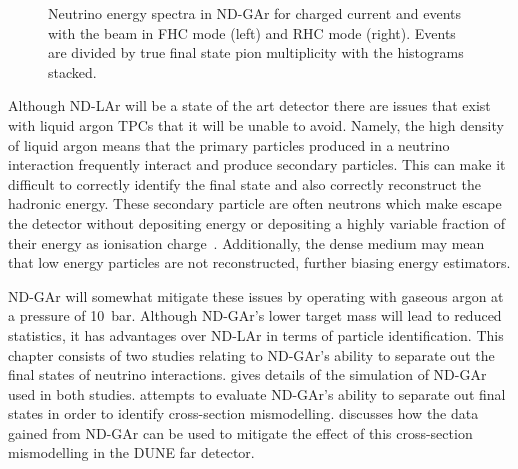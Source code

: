 \begin{figure}[h]
	\begin{minipage}[t]{.5\linewidth}
		\begin{adjustbox}{max totalsize=\linewidth, center}
				
		\end{adjustbox}
	\end{minipage}
	\hfill
	\begin{minipage}[t]{.5\linewidth}
		\begin{adjustbox}{max totalsize=\linewidth, center}
				
		\end{adjustbox}
	\end{minipage}
	\caption[Neutrino energy spectrum in ND-GAr divided by pion multiplicity]{Neutrino energy spectra in ND-GAr for charged current \numu and \anumu events with the beam in FHC mode (left) and RHC mode (right). Events are divided by true final state pion multiplicity with the histograms stacked.}
	\label{fig:energyByMode}
\end{figure}

Although ND-LAr will be a state of the art detector there are issues that exist with liquid argon TPCs that it will be unable to avoid.
Namely, the high density of liquid argon means that the primary particles produced in a neutrino interaction frequently interact and produce secondary particles.
This can make it difficult to correctly identify the final state and also correctly reconstruct the hadronic energy.
These secondary particle are often neutrons which make escape the detector without depositing energy or depositing a highly variable fraction of their energy as ionisation charge~\cite{Friedland_2019}.
Additionally, the dense medium may mean that low energy particles are not reconstructed, further biasing energy estimators.

ND-GAr will somewhat mitigate these issues by operating with gaseous argon at a pressure of 10~bar.
Although ND-GAr's lower target mass will lead to reduced statistics, it has advantages over ND-LAr in terms of particle identification.
This chapter consists of two studies relating to ND-GAr's ability to separate out the final states of neutrino interactions.
 gives details of the simulation of ND-GAr used in both studies.
 attempts to evaluate ND-GAr's ability to separate out final states in order to identify cross-section mismodelling.
 discusses how the data gained from ND-GAr can be used to mitigate the effect of this cross-section mismodelling in the DUNE far detector.

